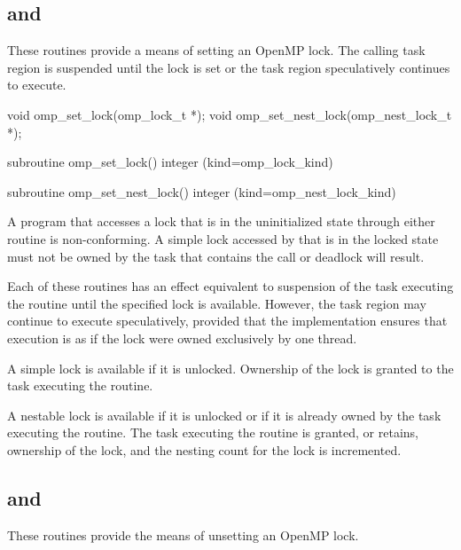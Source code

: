 \subsection{ and }
\label{subsec:omp_set_lock and omp_set_nest_lock}
\summary
These routines provide a means of setting an OpenMP lock. The calling task region is 
suspended until the lock is set or the task region speculatively continues to execute.

\format
\ccppspecificstart
\begin{boxedcode}
void omp\_set\_lock(omp\_lock\_t *);
void omp\_set\_nest\_lock(omp\_nest\_lock\_t *);
\end{boxedcode}
\ccppspecificend

\fortranspecificstart
\begin{boxedcode}
subroutine omp\_set\_lock()
integer (kind=omp\_lock\_kind) 

subroutine omp\_set\_nest\_lock()
integer (kind=omp\_nest\_lock\_kind) 
\end{boxedcode}
\fortranspecificend

\constraints
A program that accesses a lock that is in the uninitialized state through either routine is 
non-conforming. A simple lock accessed by  that is in the locked state 
must not be owned by the task that contains the call or deadlock will result.

\effect
Each of these routines has an effect equivalent to suspension of the task
executing the routine until the specified lock is available. However, the
task region may continue to execute speculatively, provided that the 
implementation ensures that execution is as if the lock were owned
exclusively by one thread. 

A simple lock is available if it is unlocked. Ownership of the lock is 
granted to the task executing the routine.

A nestable lock is available if it is unlocked or if it is already owned by 
the task executing the routine. The task executing the routine is granted, 
or retains, ownership of the lock, and the nesting count for the lock is 
incremented.




\subsection{ and }
\label{subsec:omp_unset_lock and omp_unset_nest_lock}
\summary
These routines provide the means of unsetting an OpenMP lock.

